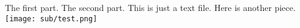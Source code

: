 \documentclass[11pt]{article}
\begin{document}
The first part.
The second part.
This is just a text file.
Here is another piece.
\texttt{[image: sub/test.png]}
\end{document}
